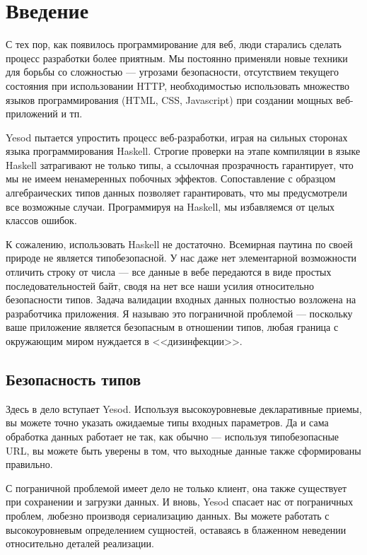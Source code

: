 \chapter{Введение}

С тех пор, как появилось программирование для веб, люди старались сделать процесс разработки более приятным. Мы постоянно применяли новые техники для борьбы со сложностью --- угрозами безопасности, отсутствием текущего состояния при использовании HTTP, необходимостью использовать множество языков программирования (HTML, CSS, Javascript) при создании мощных веб-приложений и тп.

Yesod пытается упростить процесс веб-разработки, играя на сильных сторонах языка программирования Haskell. Строгие проверки на этапе компиляции в языке Haskell затрагивают не только типы, а ссылочная прозрачность гарантирует, что мы не имеем ненамеренных побочных эффектов. Сопоставление с образцом алгебраических типов данных позволяет гарантировать, что мы предусмотрели все возможные случаи. Программируя на Haskell, мы избавляемся от целых классов ошибок.

К сожалению, использовать Haskell не достаточно. Всемирная паутина по своей природе не является типобезопасной. У нас даже нет элементарной возможности отличить строку от числа --- все данные в вебе передаются в виде простых последовательностей байт, сводя на нет все наши усилия относительно безопасности типов. Задача валидации входных данных полностью возложена на разработчика приложения. Я называю это пограничной проблемой --- поскольку ваше приложение является безопасным в отношении типов, любая граница с окружающим миром нуждается в <<дизинфекции>>.

\section{Безопасность типов}

Здесь в дело вступает Yesod. Используя высокоуровневые декларативные приемы, вы можете точно указать ожидаемые типы входных параметров. Да и сама обработка данных работает не так, как обычно --- используя типобезопасные URL, вы можете быть уверены в том, что выходные данные также сформированы правильно.

С пограничной проблемой имеет дело не только клиент, она также существует при сохранении и загрузки данных. И вновь, Yesod спасает нас от пограничных проблем, любезно производя сериализацию данных. Вы можете работать с высокоуровневым определением сущностей, оставаясь в блаженном неведении относительно деталей реализации.

